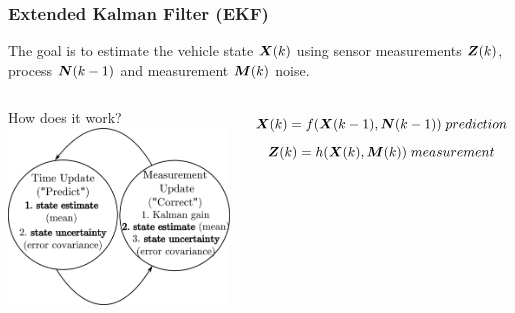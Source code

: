 \begin{frame}\frametitle{Extended Kalman Filter (EKF)}%
The goal is to estimate the vehicle state $\boldsymbol{X}(k)$ using sensor measurements $\boldsymbol{Z}(k)$, process $\boldsymbol{N}(k-1)$ and measurement $\boldsymbol{M}(k)$ noise. \\
\begin{columns}
	\begin{block}{How does it work?}
	\centering
	\includegraphics[width=0.85\linewidth]{fig/diagram-kalman.pdf}
	\end{block} 
\vspace{-25pt}	
	\begin{equation*} 
	\boldsymbol{X}(k) = f(\boldsymbol{X}(k-1), \boldsymbol{N}(k-1)) \; prediction
	\end{equation*}
\vspace{-25pt}	
	\begin{equation*}
	\vect{Z}(k) = h(\vect{X}(k), \vect{M}(k))  \; measurement%
	\end{equation*}


\end{columns}
\end{frame}
